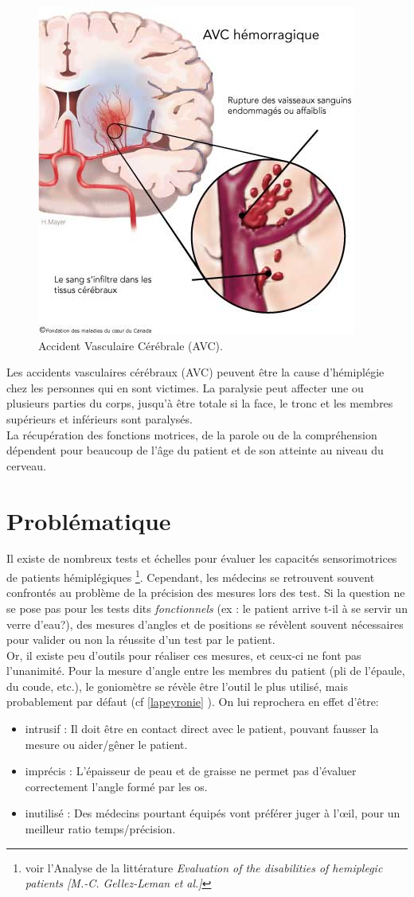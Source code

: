 \begin{figure}[h!]
\centering
\includegraphics[width=0.5\linewidth]{../images/avc}
\caption{Accident Vasculaire Cérébrale (AVC).}
\end{figure}

Les accidents vasculaires cérébraux (AVC) peuvent être la cause d'hémiplégie chez les personnes qui en sont victimes. La paralysie peut affecter une ou plusieurs parties du corps, jusqu'à être totale si la face, le tronc et les membres supérieurs et inférieurs sont paralysés. \\
La récupération des fonctions motrices, de la parole ou de la compréhension dépendent pour beaucoup de l'âge du patient et de son atteinte au niveau du cerveau.
    \section{Problématique}
Il existe de nombreux tests et échelles pour évaluer les capacités sensorimotrices de patients hémiplégiques \footnote{voir l'Analyse de la littérature \textit{Evaluation of the disabilities of hemiplegic patients [M.-C. Gellez-Leman et al.]}}. Cependant, les médecins se retrouvent souvent confrontés au problème de la précision des mesures lors des test. Si la question ne se pose pas pour les tests dits \textit{fonctionnels} (ex : le patient arrive t-il à se servir un verre d'eau?), des mesures d'angles et de positions se révèlent souvent nécessaires pour valider ou non la réussite d'un test par le patient.
\\Or, il existe peu d'outils pour réaliser ces mesures, et ceux-ci ne font pas l'unanimité. Pour la mesure d'angle entre les membres du patient (pli de l'épaule, du coude, etc.), le goniomètre se révèle être l'outil le plus utilisé, mais probablement par défaut (cf \ref{lapeyronie} ). On lui reprochera en effet d'être: 
\begin{itemize}
  \item {intrusif :} Il doit être en contact direct avec le patient, pouvant fausser la mesure ou aider/gêner le patient.
  \item {imprécis :} L'épaisseur de peau et de graisse ne permet pas d'évaluer correctement l'angle formé par les os.
  \item {inutilisé :} Des médecins pourtant équipés vont préférer juger à l'œil, pour un meilleur ratio temps/précision.
\end{itemize}

